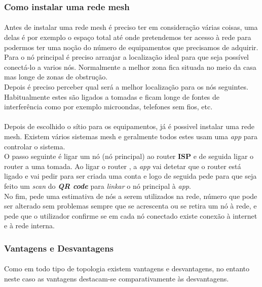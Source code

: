 \documentclass[letterpaper, 11pt]{article}
\begin{document}
\subsubsection{Como instalar uma rede mesh}
\label{sec:org5b19c29}

\paragraph{}
Antes de instalar uma rede mesh é preciso ter em consideração várias coisas, uma delas é por exemplo o espaço total até onde pretendemos ter acesso à rede para podermos ter uma noção
do número de equipamentos que precisamos de adquirir.\\
Para o nó principal é preciso arranjar a localização ideal para que seja possível conectá-lo a varios nós. Normalmente a melhor zona fica situada no meio da casa mas longe de zonas
de obstrução.\\
Depois é preciso perceber qual será a melhor localização para os nós seguintes. Habitualmente estes são ligados a tomadas e ficam longe de fontes de interferência como por exemplo microondas, telefones
sem fios, etc.

\paragraph{}
Depois de escolhido o sítio para os equipamentos, já é possivel instalar uma rede mesh. Existem vários sistemas mesh e geralmente todos estes usam uma \emph{app} para controlar o sistema.\\
O passo seguinte é ligar um nó (nó principal) ao router \textbf{ISP} e de seguida ligar o router a uma tomada. Ao ligar o router , a \emph{app} vai detetar que o router está ligado e vai
pedir para ser criada uma conta e logo de seguida pede para que seja feito um \emph{scan} do \emph{\textbf{QR code}} para \emph{linkar} o nó principal à \emph{app}.\\
No fim, pede uma estimativa de nós a serem utilizados na rede, número que pode ser alterado sem problemas sempre que se acrescenta ou se retira um nó à rede, e pede que o utilizador confirme
se em cada nó conectado existe conexão à internet e à rede interna.


\subsubsection{Vantagens e Desvantagens}
\label{sec:org78a6104}

\paragraph{}
Como em todo tipo de topologia existem vantagens e desvantagens, no entanto neste caso as vantagens destacam-se comparativamente às desvantagens.
\end{document}
